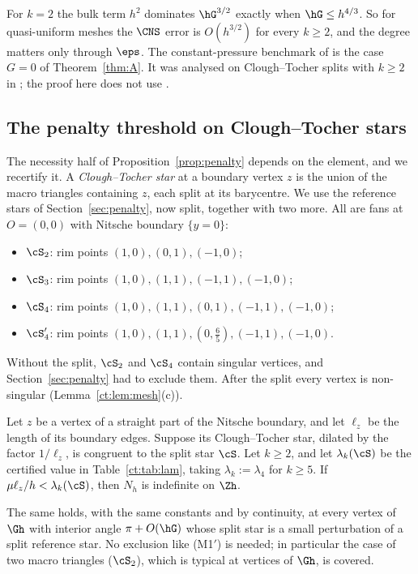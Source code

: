 \begin{remark}
For $k=2$ the bulk term $h^2$ dominates $\hG^{3/2}$ exactly when $\hG\le h^{4/3}$. So for quasi-uniform meshes the $\CNS$ error is $O(h^{3/2})$ for every $k\ge2$, and the degree matters only through $\eps$. The constant-pressure benchmark of \cite{GjerdeScott2024} is the case $G=0$ of Theorem~\ref{thm:A}. It was analysed on Clough--Tocher splits with $k\ge2$ in \cite{Cavalcante}; the proof here does not use \cite{Cavalcante}.
\end{remark}

\subsection{The penalty threshold on Clough--Tocher stars}

The necessity half of Proposition~\ref{prop:penalty} depends on the element, and we recertify it. A \emph{Clough--Tocher star} at a boundary vertex $z$ is the union of the macro triangles containing $z$, each split at its barycentre. We use the reference stars of Section~\ref{sec:penalty}, now split, together with two more. All are fans at $O=(0,0)$ with Nitsche boundary $\{y=0\}$:
\begin{itemize}
\item $\cS_2$: rim points $(1,0),(0,1),(-1,0)$;
\item $\cS_3$: rim points $(1,0),(1,1),(-1,1),(-1,0)$;
\item $\cS_4$: rim points $(1,0),(1,1),(0,1),(-1,1),(-1,0)$;
\item $\cS_4'$: rim points $(1,0),(1,1),(0,\tfrac65),(-1,1),(-1,0)$.
\end{itemize}
Without the split, $\cS_2$ and $\cS_4$ contain singular vertices, and Section~\ref{sec:penalty} had to exclude them. After the split every vertex is non-singular (Lemma~\ref{ct:lem:mesh}(c)).

\begin{proposition}\label{ct:prop:penalty}
Let $z$ be a vertex of a straight part of the Nitsche boundary, and let $\ell_z$ be the length of its boundary edges. Suppose its Clough--Tocher star, dilated by the factor $1/\ell_z$, is congruent to the split star $\cS$. Let $k\ge2$, and let $\lambda_k(\cS)$ be the certified value in Table~\ref{ct:tab:lam}, taking $\lambda_k:=\lambda_4$ for $k\ge5$. If $\mu\ell_z/h<\lambda_k(\cS)$, then $N_h$ is indefinite on $\Zh$.

The same holds, with the same constants and by continuity, at every vertex of $\Gh$ with interior angle $\pi+O(\hG)$ whose split star is a small perturbation of a split reference star. No exclusion like (M1$'$) is needed; in particular the case of two macro triangles ($\cS_2$), which is typical at vertices of $\Gh$, is covered.
\end{proposition}

